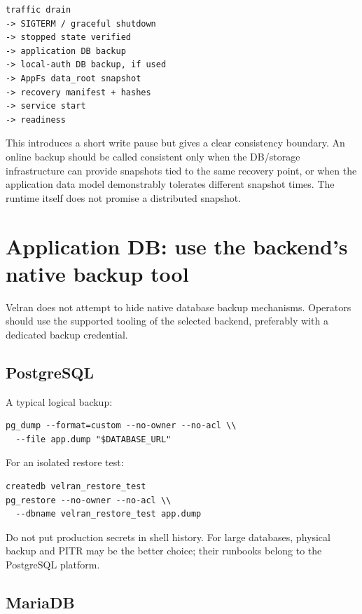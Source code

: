 \begin{lstlisting}
traffic drain
-> SIGTERM / graceful shutdown
-> stopped state verified
-> application DB backup
-> local-auth DB backup, if used
-> AppFs data_root snapshot
-> recovery manifest + hashes
-> service start
-> readiness
\end{lstlisting}

This introduces a short write pause but gives a clear consistency boundary. An online backup should be called consistent only when the DB/storage infrastructure can provide snapshots tied to the same recovery point, or when the application data model demonstrably tolerates different snapshot times. The runtime itself does not promise a distributed snapshot.

\section{Application DB: use the backend's native backup tool}

Velran does not attempt to hide native database backup mechanisms. Operators should use the supported tooling of the selected backend, preferably with a dedicated backup credential.

\subsection*{PostgreSQL}

A typical logical backup:

\begin{lstlisting}
pg_dump --format=custom --no-owner --no-acl \\
  --file app.dump "$DATABASE_URL"
\end{lstlisting}

For an isolated restore test:

\begin{lstlisting}
createdb velran_restore_test
pg_restore --no-owner --no-acl \\
  --dbname velran_restore_test app.dump
\end{lstlisting}

Do not put production secrets in shell history. For large databases, physical backup and PITR may be the better choice; their runbooks belong to the PostgreSQL platform.

\subsection*{MariaDB}

